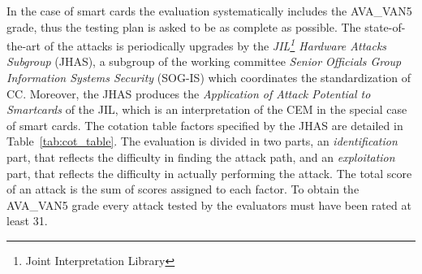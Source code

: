 In the case of smart cards the evaluation systematically includes the AVA\_VAN5 grade, thus the testing plan is asked to be as complete as possible. The state-of-the-art of the attacks is periodically upgrades by the \emph{JIL\footnote{Joint Interpretation Library} Hardware Attacks Subgroup} (JHAS), a subgroup of the working committee \emph{Senior Officials Group Information Systems Security} (SOG-IS) which coordinates the standardization of CC. Moreover, the JHAS produces the \emph{Application of Attack Potential to Smartcards} \cite{JIL} of the JIL, which is an interpretation of the CEM in the special case of smart cards. The cotation table factors specified by the JHAS are detailed in Table~\ref{tab:cot_table}. The evaluation is divided in two parts, an \emph{identification} part, that reflects the difficulty in finding the attack path, and an \emph{exploitation} part, that reflects the difficulty in actually performing the attack. The total score of an attack is the sum of scores assigned to each factor. To obtain the AVA\_VAN5 grade every attack tested by the evaluators must have been rated at least 31.\\




